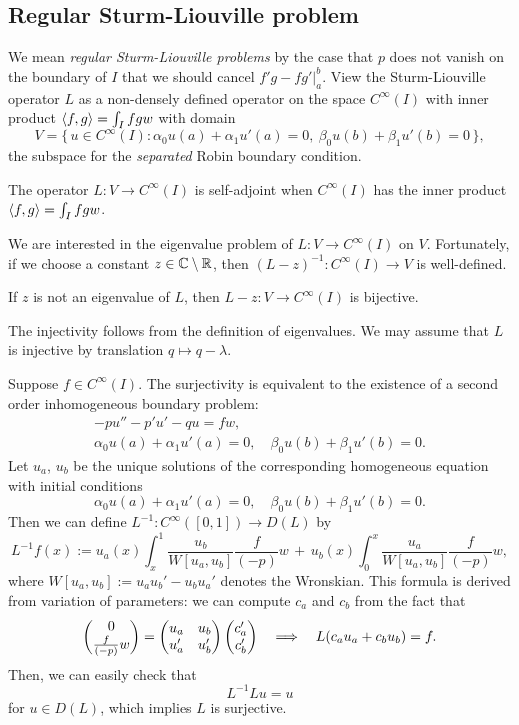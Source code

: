 \documentclass[11pt]{article}
\begin{document}
\subsection{Regular Sturm-Liouville problem}
We mean \emph{regular Sturm-Liouville problems} by the case that $p$ does not vanish on the boundary of $I$ that we should cancel $f'g-fg'|_a^b$.
View the Sturm-Liouville operator $L$ as a non-densely defined operator on the space $C^\infty(I)$ with inner product $\langle f,g\rangle=\int_Ifgw$ with domain
\[V=\{\,u\in C^\infty(I):\alpha_0u(a)+\alpha_1u'(a)=0,\ \beta_0u(b)+\beta_1u'(b)=0\,\},\]
the subspace for the \emph{separated} Robin boundary condition.
\begin{prop}
The operator $L:V\to C^\infty(I)$ is self-adjoint when $C^\infty(I)$ has the inner product $\langle f,g\rangle=\int_Ifgw$.
\end{prop}
We are interested in the eigenvalue problem of $L:V\to C^\infty(I)$ on $V$.
Fortunately, if we choose a constant $z\in\mathbb{C}\setminus\mathbb{R}$, then $(L-z)^{-1}:C^\infty(I)\to V$ is well-defined.
\begin{prop}
If $z$ is not an eigenvalue of $L$, then $L-z:V\to C^\infty(I)$ is bijective.
\end{prop}
\begin{pf}
The injectivity follows from the definition of eigenvalues.
We may assume that $L$ is injective by translation $q\mapsto q-\lambda$.

Suppose $f\in C^\infty(I)$.
The surjectivity is equivalent to the existence of a second order inhomogeneous boundary problem:
\begin{gather*}
-pu''-p'u'-qu=fw,\\
\alpha_0u(a)+\alpha_1u'(a)=0,\quad\beta_0u(b)+\beta_1u'(b)=0.
\end{gather*}
Let $u_a$, $u_b$ be the unique solutions of the corresponding homogeneous equation with initial conditions
\[\alpha_0u(a)+\alpha_1u'(a)=0,\quad\beta_0u(b)+\beta_1u'(b)=0.\]
Then we can define $L^{-1}:C^\infty([0,1])\to D(L)$ by
\[L^{-1}f(x):=u_a(x)\int_x^1\frac{u_b}{W[u_a,u_b]}\frac f{(-p)}w\,+\,u_b(x)\int_0^x\frac{u_a}{W[u_a,u_b]}\frac f{(-p)}w,\]
where $W[u_a,u_b]:=u_au_b'-u_bu_a'$ denotes the Wronskian.
This formula is derived from variation of parameters: we can compute $c_a$ and $c_b$ from the fact that
\[\begin{pmatrix}0\\\frac f{(-p)}w\end{pmatrix}=\begin{pmatrix}u_a&u_b\\u_a'&u_b'\end{pmatrix}\begin{pmatrix}c_a'\\c_b'\end{pmatrix}\impl L(c_au_a+c_bu_b)=f.\]
Then, we can easily check that
\[L^{-1}Lu=u\]
for $u\in D(L)$, which implies $L$ is surjective.
\end{pf}
\end{document}
